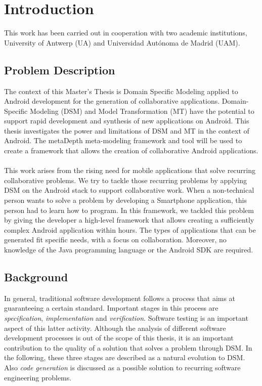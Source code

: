 \chapter{Introduction}

This work has been carried out in cooperation with two academic institutions, University of Antwerp (UA) and Universidad Aut\'onoma de Madrid (UAM).

\section{Problem Description}

The context of this Master's Thesis is Domain Specific Modeling applied to Android development for the generation of collaborative applications. Domain-Specific Modeling (DSM) and Model Transformation (MT) have the potential to support rapid development and synthesis of new applications on Android. This thesis investigates the power and limitations of DSM and MT in the context of Android. The metaDepth meta-modeling framework and tool will be used to create a framework that allows the creation of collaborative Android applications.
\\ \\
This work arises from the rising need for mobile applications that solve recurring collaborative problems. We try to tackle those recurring problems by applying DSM on the Android stack to support collaborative work. When a non-technical person wants to solve a problem by developing a Smartphone application, this person had to learn how to program. In this framework, we tackled this problem by giving the developer a high-level framework that allows creating a sufficiently complex Android application within hours. The types of applications that can be generated fit specific needs, with a focus on collaboration. Moreover, no knowledge of the Java programming language or the Android SDK are required.

\section{Background}

In general, traditional software development follows a process that aims at guaranteeing a certain standard. Important stages in this process are \textit{specification}, \textit{implementation} and \textit{verification}. Software testing is an important aspect of this latter activity. Although the analysis of different software development processes is out of the scope of this thesis, it is an important contribution to the quality of a solution that solves a problem through DSM. In the following, these three stages are described as a natural evolution to DSM. Also \textit{code generation} is discussed as a possible solution to recurring software engineering problems.

